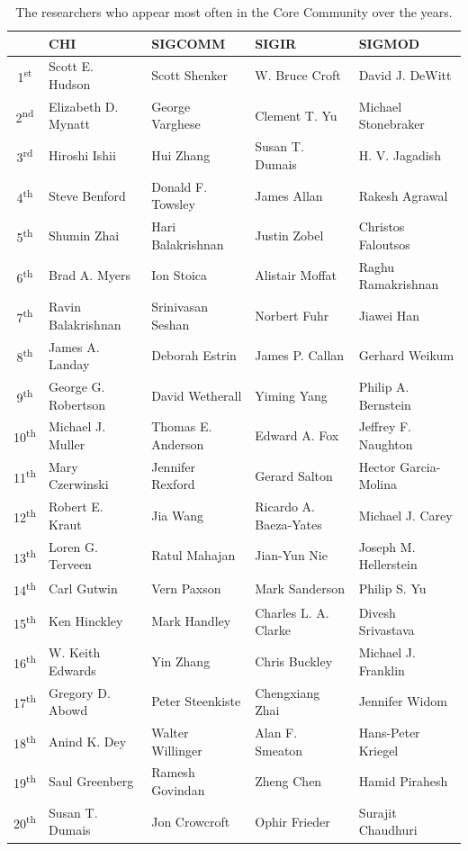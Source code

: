 \begin{table}[!htb]
\centering
\caption{The researchers who appear most often in the Core Community over the years.}
\label{tab:authors_frequency_core_community}
{\small
\begin{tabular}{|c|l|l|l|l|} \hline
  & \bf{CHI} & \bf{SIGCOMM} & \bf{SIGIR} & \bf{SIGMOD}\\ \hline
1\textsuperscript{st} & Scott E. Hudson & Scott Shenker & W. Bruce Croft & David J. DeWitt\\ \hline
2\textsuperscript{nd} & Elizabeth D. Mynatt & George Varghese & Clement T. Yu & Michael Stonebraker\\ \hline
3\textsuperscript{rd} & Hiroshi Ishii & Hui Zhang & Susan T. Dumais & H. V. Jagadish\\ \hline
4\textsuperscript{th} & Steve Benford & Donald F. Towsley & James Allan & Rakesh Agrawal\\ \hline
5\textsuperscript{th} & Shumin Zhai & Hari Balakrishnan & Justin Zobel & Christos Faloutsos\\ \hline
6\textsuperscript{th} & Brad A. Myers & Ion Stoica & Alistair Moffat & Raghu Ramakrishnan\\ \hline
7\textsuperscript{th} & Ravin Balakrishnan & Srinivasan Seshan & Norbert Fuhr & Jiawei Han\\ \hline
8\textsuperscript{th} & James A. Landay & Deborah Estrin & James P. Callan & Gerhard Weikum\\ \hline
9\textsuperscript{th} & George G. Robertson & David Wetherall & Yiming Yang & Philip A. Bernstein\\ \hline
10\textsuperscript{th} & Michael J. Muller & Thomas E. Anderson & Edward A. Fox & Jeffrey F. Naughton\\ \hline
11\textsuperscript{th} & Mary Czerwinski & Jennifer Rexford & Gerard Salton & Hector Garcia-Molina\\ \hline
12\textsuperscript{th} & Robert E. Kraut & Jia Wang & Ricardo A. Baeza-Yates & Michael J. Carey\\ \hline
13\textsuperscript{th} & Loren G. Terveen & Ratul Mahajan & Jian-Yun Nie & Joseph M. Hellerstein\\ \hline
14\textsuperscript{th} & Carl Gutwin & Vern Paxson & Mark Sanderson & Philip S. Yu\\ \hline
15\textsuperscript{th} & Ken Hinckley & Mark Handley & Charles L. A. Clarke & Divesh Srivastava\\ \hline
16\textsuperscript{th} & W. Keith Edwards & Yin Zhang & Chris Buckley & Michael J. Franklin\\ \hline
17\textsuperscript{th} & Gregory D. Abowd & Peter Steenkiste & Chengxiang Zhai & Jennifer Widom\\ \hline
18\textsuperscript{th} & Anind K. Dey & Walter Willinger & Alan F. Smeaton & Hans-Peter Kriegel\\ \hline
19\textsuperscript{th} & Saul Greenberg & Ramesh Govindan & Zheng Chen & Hamid Pirahesh\\ \hline
20\textsuperscript{th} & Susan T. Dumais & Jon Crowcroft & Ophir Frieder & Surajit Chaudhuri\\ \hline
\end{tabular}
}
\end{table}



